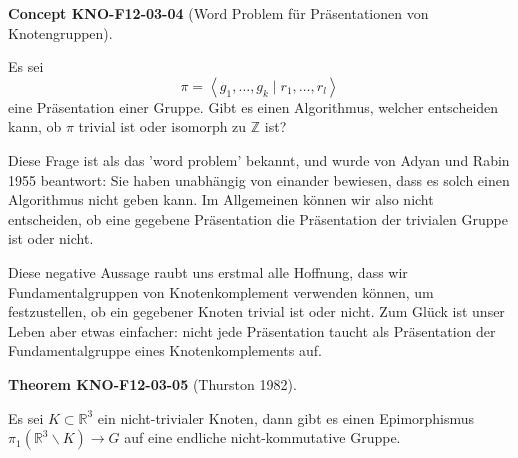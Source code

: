 \documentclass[10pt, letterpaper]{article}
\newcommand{\CustomHeading}[3]{%
  \par\medskip\noindent%
  \textbf{#1 #2} \textnormal{(#3)}.\enskip%
}
\newenvironment{THEO}[2]{\CustomHeading{Theorem}{#1}{#2}}{}
\newenvironment{CONC}[2]{\CustomHeading{Concept}{#1}{#2}}{}
\begin{document}
\begin{CONC}{KNO-F12-03-04}{Word Problem für Präsentationen von Knotengruppen}
Es sei
$$
\pi=\left\langle g_1, \ldots, g_k \mid r_1, \ldots, r_l\right\rangle
$$
eine Präsentation einer Gruppe. Gibt es einen Algorithmus, welcher entscheiden kann, ob $\pi$ trivial ist oder isomorph zu $\mathbb{Z}$ ist?

Diese Frage ist als das 'word problem' bekannt, und wurde von Adyan und Rabin 1955 beantwort: Sie haben unabhängig von einander bewiesen, dass es solch einen Algorithmus nicht geben kann. Im Allgemeinen können wir also nicht entscheiden, ob eine gegebene Präsentation die Präsentation der trivialen Gruppe ist oder nicht.

Diese negative Aussage raubt uns erstmal alle Hoffnung, dass wir Fundamentalgruppen von Knotenkomplement verwenden können, um festzustellen, ob ein gegebener Knoten trivial ist oder nicht. Zum Glück ist unser Leben aber etwas einfacher: nicht jede Präsentation taucht als Präsentation der Fundamentalgruppe eines Knotenkomplements auf.
\end{CONC}

\begin{THEO}{KNO-F12-03-05}{Thurston 1982}
Es sei $K \subset \mathbb{R}^3$ ein nicht-trivialer Knoten, dann gibt es einen Epimorphismus $\pi_1\left(\mathbb{R}^3 \backslash K\right) \rightarrow G$ auf eine endliche nicht-kommutative Gruppe.
\end{THEO}
\end{document}
